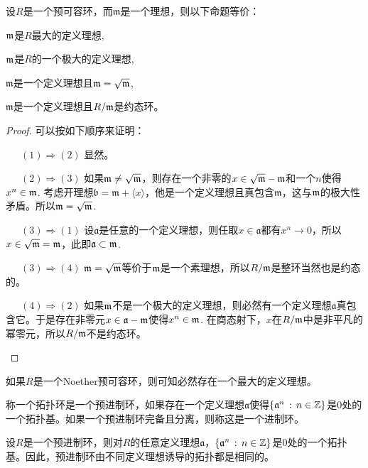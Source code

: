 \begin{pro}设$R$是一个预可容环，而$\mathfrak{m}$是一个理想，则以下命题等价：
\begin{compactenum}[~~~(1)]
\item $\mathfrak{m}$是$R$最大的定义理想,
\item $\mathfrak{m}$是$R$的一个极大的定义理想,
\item $\mathfrak{m}$是一个定义理想且$\mathfrak{m}=\sqrt{\mathfrak{m}}$,
\item $\mathfrak{m}$是一个定义理想且$R/\mathfrak{m}$是约态环。
\end{compactenum}
\end{pro}

\begin{proof}可以按如下顺序来证明：
\begin{compactitem}
\item[~~~$(1)\Rightarrow (2)$] 显然。
\item[~~~$(2)\Rightarrow (3)$] 如果$\mathfrak{m}\neq\sqrt{\mathfrak{m}}$，则存在一个非零的$x\in \sqrt{\mathfrak{m}}-\mathfrak{m}$和一个$n$使得$x^n\in \mathfrak{m}$. 考虑开理想$\mathfrak{b}=\mathfrak{m}+\langle x\rangle$，他是一个定义理想且真包含$\mathfrak{m}$，这与$\mathfrak{m}$的极大性矛盾。所以$\mathfrak{m}=\sqrt{\mathfrak{m}}$.
\item[~~~$(3)\Rightarrow (1)$] 设$\mathfrak{a}$是任意的一个定义理想，则任取$x\in \mathfrak{a}$都有$x^n\to 0$，所以$x\in \sqrt{\mathfrak{m}}=\mathfrak{m}$，此即$\mathfrak{a}\subset \mathfrak{m}$.
\item[~~~$(3)\Rightarrow (4)$] $\mathfrak{m}=\sqrt{\mathfrak{m}}$等价于$\mathfrak{m}$是一个素理想，所以$R/\mathfrak{m}$是整环当然也是约态的。
\item[~~~$(4)\Rightarrow (2)$] 如果$\mathfrak{m}$不是一个极大的定义理想，则必然有一个定义理想$\mathfrak{a}$真包含它。于是存在非零元$x\in \mathfrak{a}-\mathfrak{m}$使得$x^n\in \mathfrak{m}$. 在商态射下，$x$在$R/\mathfrak{m}$中是非平凡的幂零元，所以$R/\mathfrak{m}$不是约态环。
\end{compactitem}
\end{proof}

如果$R$是一个Noether预可容环，则可知必然存在一个最大的定义理想。

\begin{para}
称一个拓扑环是一个预进制环，如果存在一个定义理想$\mathfrak{a}$使得$\{\mathfrak{a}^n\,:\,n\in \mathbb{Z}\}$是$0$处的一个拓扑基。如果一个预进制环完备且分离，则称这是一个进制环。
\end{para}

\begin{lem}
设$R$是一个预进制环，则对$R$的任意定义理想$\mathfrak{a}$，$\{\mathfrak{a}^n\,:\,n\in \mathbb{Z}\}$是$0$处的一个拓扑基。因此，预进制环由不同定义理想诱导的拓扑都是相同的。
\end{lem}

